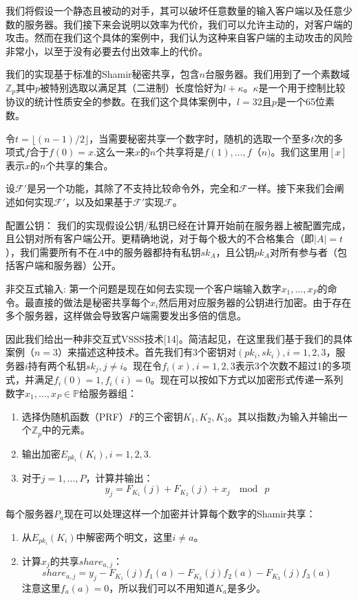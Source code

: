 我们将假设一个静态且被动的对手，其可以破坏任意数量的输入客户端以及任意少数的服务器。我们接下来会说明以效率为代价，我们可以允许主动的，对客户端的攻击。然而在我们这个具体的案例中，我们认为这种来自客户端的主动攻击的风险非常小，以至于没有必要去付出效率上的代价。

我们的实现基于标准的Shamir秘密共享，包含$n$台服务器。我们用到了一个素数域$\mathbb{Z}_p$其中$p$被特别选取以满足其（二进制）长度恰好为$l+\kappa$。$\kappa$是一个用于控制比较协议的统计性质安全的参数。在我们这个具体案例中，$l=32$且$p$是一个65位素数。

令$t=\lfloor(n-1)/2\rfloor$，当需要秘密共享一个数字时，随机的选取一个至多$t$次的多项式$f$合于$f(0)=x$.这么一来$x$的$n$个共享将是$f(1),\dots,f（n)$。我们这里用$[x]$表示$x$的$n$个共享的集合。

设$\mathcal{F}'$是另一个功能，其除了不支持比较命令外，完全和$\mathcal{F}$一样。接下来我们会阐述如何实现$\mathcal{F}'$，以及如果基于$\mathcal{F}'$实现$\mathcal{F}$。

{\heiti 配置公钥：} 我们的实现假设公钥/私钥已经在计算开始前在服务器上被配置完成，且公钥对所有客户端公开。更精确地说，对于每个极大的不合格集合（即$|A|=t$），我们需要所有不在$A$中的服务器都持有私钥$sk_A$，且公钥$pk_A$对所有参与者（包括客户端和服务器）公开。

{\heiti 非交互式输入:} 第一个问题是现在如何去实现一个客户端输入数字$x_1,\dots,x_P$的命令。最直接的做法是秘密共享每个$x_i$然后用对应服务器的公钥进行加密。由于存在多个服务器，这样做会导致客户端需要发出多倍的信息。

因此我们给出一种非交互式VSSS技术[14]。简洁起见，在这里我们基于我们的具体案例（$n=3$）来描述这种技术。首先我们有3个密钥对$(pk_i,sk_i),i=1,2,3$，服务器$i$持有两个私钥$sk_j,j\neq i$。现在令$f_i(x),i=1,2,3$表示3个次数不超过1的多项式，并满足$f_i(0)=1,f_i(i)=0$。现在可以按如下方式以加密形式传递一系列数字$x_1,\dots,x_P\in\mathbb{P}$给服务器组：
\begin{enumerate}
	\item 选择伪随机函数（PRF）$F$的三个密钥$K_1,K_2,K_3$。其以指数$j$为输入并输出一个$\mathbb{Z}_p$中的元素。
	\item 输出加密$E_{pk_i}(K_i),i=1,2,3$.
	\item 对于$j=1,\dots,P$，计算并输出：
		$$y_j=F_{K_1}(j)+F_{K_2}(j)+x_j\ \mod\ p$$
\end{enumerate}
每个服务器$P_a$现在可以处理这样一个加密并计算每个数字的Shamir共享：
\begin{enumerate}
	\item 从$E_{pk_i}(K_i)$中解密两个明文，这里$i\neq a$。
	\item 计算$x_j$的共享$share_{a,j}$：
	$$share_{a,j}=y_j-F_{K_1}(j)f_1(a)-F_{K_2}(j)f_2(a)-F_{K_3}(j)f_3(a)$$
	注意这里$f_a(a)=0$，所以我们可以不用知道$K_a$是多少。
\end{enumerate}

